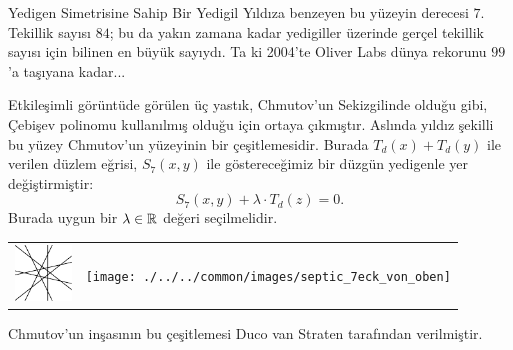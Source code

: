 \begin{surferPage}[Yedigen]{Yedigen Simetrisine Sahip Bir Yedigil}
Yıldıza benzeyen bu yüzeyin derecesi  $7$.
Tekillik sayısı $84$; bu da yakın zamana kadar yedigiller üzerinde gerçel tekillik sayısı için bilinen en büyük sayıydı. Ta ki 2004'te  Oliver Labs dünya rekorunu $99$'a taşıyana kadar...
  
Etkileşimli görüntüde görülen üç yastık, Chmutov'un Sekizgilinde olduğu gibi, Çebişev polinomu kullanılmış olduğu için ortaya çıkmıştır.
Aslında yıldız şekilli bu yüzey Chmutov'un yüzeyinin bir çeşitlemesidir.
Burada $T_d(x)+T_d(y)$ ile verilen düzlem eğrisi, $S_7(x,y)$ ile göstereceğimiz bir düzgün yedigenle yer değiştirmiştir:
   \[S_7(x,y) + \lambda \cdot T_d(z) = 0.\]
Burada uygun bir $\lambda\in{\mathbb R}$ değeri seçilmelidir. 
    \vspace*{-0.3em}
    \begin{center}
      \begin{tabular}{c@{\qquad}c}
        \includegraphics[height=1.5cm]{./../../common/images/labsseptic1.pdf}
        &
        \texttt{[image: ./../../common/images/septic\_7eck\_von\_oben]}
      \end{tabular}
    \end{center}
    \vspace*{-0.3em}   
Chmutov'un inşasının bu çeşitlemesi Duco van Straten tarafından verilmiştir.
\end{surferPage}
